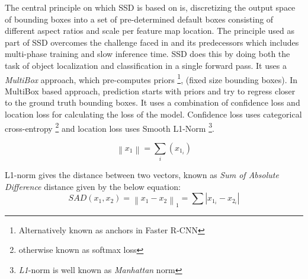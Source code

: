 \newpara The central principle on which SSD \cite{liu2016ssd} is based on is, discretizing the output space of bounding boxes into a set of pre-determined default boxes consisting of different aspect ratios and scale per feature map location. The principle used as part of SSD overcomes the challenge faced in \cite{ren2015faster} and its predecessors which includes multi-phase training and slow inference time. SSD does this by doing both the task of object localization and classification in a single forward pass. It uses a \textit{MultiBox} approach, which pre-computes priors \footnote{Alternatively known as anchors in Faster R-CNN}, (fixed size bounding boxes). In MultiBox based approach, prediction starts with priors and try to regress closer to the ground truth bounding boxes.
It uses a combination of confidence loss and location loss for calculating the loss of the model. Confidence loss uses categorical cross-entropy \footnote{otherwise known as softmax loss} and location loss uses Smooth L1-Norm \footnote{\textit{L1}-norm is well known as \textit{Manhattan }norm}.

\begin{equation}
	\left \| x_1 \right \| =\sum_i(x_{1_i})
\end {equation}

L1-norm gives the distance between two vectors, known as \textit{Sum of Absolute Difference} distance given by the below equation:
\begin{equation}
	SAD(x_1,x_2) = \left \| x_1-x_2 \right \|_1 = \sum \left | x_{1_i}-x_{2_i} \right |
\end {equation}

